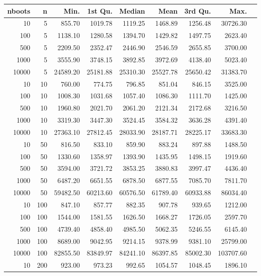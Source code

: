 \begin{table}[ht]
\centering
\begin{tabular}{rrrrrrrrr}
  \hline
nboots & n & Min. & 1st Qu. & Median & Mean & 3rd Qu. & Max. \\ 
  \hline
10 & 5 & 855.70 & 1019.78 & 1119.25 & 1468.89 & 1256.48 & 30726.30 \\ 
  100 & 5 & 1138.10 & 1280.58 & 1394.70 & 1429.82 & 1497.75 & 2623.40 \\ 
  500 & 5 & 2209.50 & 2352.47 & 2446.90 & 2546.59 & 2655.85 & 3700.00 \\ 
  1000 & 5 & 3555.90 & 3748.15 & 3892.85 & 3972.69 & 4138.40 & 5023.40 \\ 
  10000 & 5 & 24589.20 & 25181.88 & 25310.30 & 25527.78 & 25650.42 & 31383.70 \\ 
  10 & 10 & 760.00 & 774.75 & 796.85 & 851.04 & 846.15 & 3525.00 \\ 
  100 & 10 & 1008.30 & 1031.68 & 1057.40 & 1086.30 & 1111.70 & 1425.00 \\ 
  500 & 10 & 1960.80 & 2021.70 & 2061.20 & 2121.34 & 2172.68 & 3216.50 \\ 
  1000 & 10 & 3319.30 & 3447.30 & 3524.45 & 3584.32 & 3636.28 & 4391.40 \\ 
  10000 & 10 & 27363.10 & 27812.45 & 28033.90 & 28187.71 & 28225.17 & 33683.30 \\ 
  10 & 50 & 816.50 & 833.10 & 859.90 & 883.24 & 897.88 & 1488.50 \\ 
  100 & 50 & 1330.60 & 1358.97 & 1393.90 & 1435.95 & 1498.15 & 1919.60 \\ 
  500 & 50 & 3594.00 & 3721.72 & 3853.25 & 3880.83 & 3997.47 & 4436.40 \\ 
  1000 & 50 & 6487.20 & 6651.55 & 6878.50 & 6877.55 & 7085.70 & 7811.70 \\ 
  10000 & 50 & 59482.50 & 60213.60 & 60576.50 & 61789.40 & 60933.88 & 86034.40 \\ 
  10 & 100 & 847.10 & 857.77 & 882.35 & 907.78 & 939.65 & 1212.00 \\ 
  100 & 100 & 1544.00 & 1581.55 & 1626.50 & 1668.27 & 1726.05 & 2597.70 \\ 
  500 & 100 & 4739.40 & 4858.40 & 4985.50 & 5062.35 & 5246.55 & 6145.40 \\ 
  1000 & 100 & 8689.00 & 9042.95 & 9214.15 & 9378.99 & 9381.10 & 25799.00 \\ 
  10000 & 100 & 82855.50 & 83849.97 & 84241.10 & 86397.85 & 85002.30 & 103707.60 \\ 
  10 & 200 & 923.00 & 973.23 & 992.65 & 1054.57 & 1048.45 & 1896.10 \\ 

\end{tabular}
\end{table}
